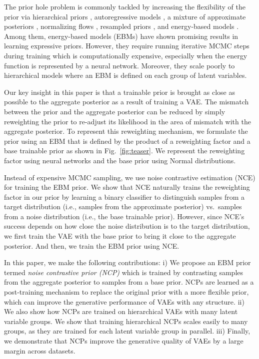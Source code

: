 \documentclass{article} \usepackage{iclr2021_conference,times}
\begin{document}
The prior hole problem is commonly tackled by increasing the flexibility of the prior via hierarchical priors \citep{klushyn2019hierarchical}, autoregressive models \citep{gulrajani2016pixelvae}, a mixture of approximate posteriors \citep{tomczak2018VampPrior}, normalizing flows \citep{xu2019priorflow}, resampled priors \citep{bauer2019resampledPrior}, and energy-based models \citep{pang2020EBMPrior, Vahdat2018DVAE++, vahdat2018dvaes, vahdat2019UndirectedPost}. Among them, energy-based models (EBMs) \citep{du2019implicit, pang2020EBMPrior} have shown promising results in learning expressive priors. However, they require running iterative MCMC steps during training which is computationally expensive, especially when the energy function is represented by a neural network. Moreover, they scale poorly to hierarchical models where an EBM is defined on each group of latent variables.

Our key insight in this paper is that a trainable prior is brought as close as possible to the aggregate posterior as a result of training a VAE. The mismatch between the prior and the aggregate posterior can be reduced by simply reweighting the prior to re-adjust its likelihood in the area of mismatch with the aggregate posterior. To represent this reweighting mechanism, we formulate the prior using an EBM that is defined by the product of a reweighting factor and a base trainable prior as shown in Fig.~\ref{fig:teaser}. We represent the reweighting factor using neural networks and the base prior using Normal distributions. 

Instead of expensive MCMC sampling, we use noise contrastive estimation (NCE) \citep{gutmann2010nce} for training the EBM prior. We show that NCE naturally trains the reweighting factor in our prior by learning a binary classifier to distinguish samples from a target distribution (i.e., samples from the approximate posterior) vs.\ samples from a noise distribution (i.e., the base trainable prior). However, since NCE's success depends on how close the noise distribution is to the target distribution, we first train the VAE with the base prior to bring it close to the aggregate posterior. And then, we train the EBM prior using NCE.

In this paper, we make the following contributions: i) We propose an EBM prior termed \textit{noise contrastive prior (NCP)} which is trained by contrasting samples from the aggregate posterior to samples from a base prior. NCPs are learned as a post-training mechanism to replace the original prior with a more flexible prior, which can improve the generative performance of VAEs with any structure. ii)  
We also show how NCPs are trained on hierarchical VAEs with many latent variable groups. We show that training hierarchical NCPs scales easily to many groups, as they are trained for each latent variable group in parallel. iii) Finally, we demonstrate that NCPs improve the generative quality of VAEs by a large margin across datasets.
 \vspace{-0.2cm}
\end{document}
